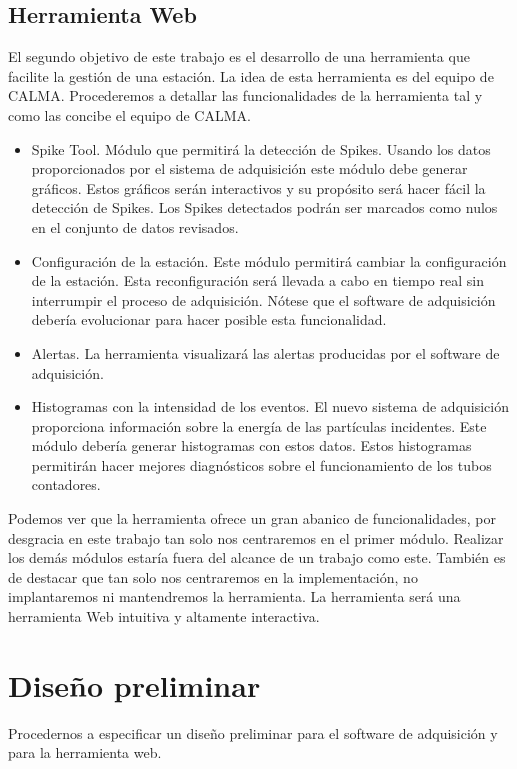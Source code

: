 	\subsection{Herramienta Web}
		El segundo objetivo de este trabajo es el desarrollo de una herramienta que facilite la gestión de una estación. La idea de esta
		herramienta es del equipo de CALMA. Procederemos a detallar las funcionalidades de la herramienta tal y como las concibe el equipo de
		CALMA.
		\begin{itemize}
	         	\item	Spike Tool. Módulo que permitirá la detección de Spikes. Usando los datos proporcionados por el sistema de
			  	adquisición este módulo debe generar gráficos. Estos gráficos serán interactivos y su propósito será hacer fácil la
				detección de Spikes. Los Spikes detectados podrán ser marcados como nulos en el conjunto de datos revisados. 
			\item 	Configuración de la estación. Este módulo permitirá cambiar la configuración de la estación. Esta reconfiguración será
				llevada a cabo en tiempo real sin interrumpir el proceso de adquisición. Nótese que el software de adquisición debería
				evolucionar para hacer posible esta funcionalidad.
			\item	Alertas. La herramienta visualizará las alertas producidas por el software de adquisición.
			\item 	Histogramas con la intensidad de los eventos. El nuevo sistema de adquisición proporciona información sobre la energía
				de las partículas incidentes. Este módulo debería generar histogramas con estos datos. Estos histogramas permitirán
				hacer mejores diagnósticos sobre el funcionamiento de los tubos contadores. 
		\end{itemize}
		Podemos ver que la herramienta ofrece un gran abanico de funcionalidades, por desgracia en este trabajo tan solo nos centraremos en el
		primer módulo. Realizar los demás módulos estaría fuera del alcance de un trabajo como este. También es de destacar que tan solo nos
		centraremos en la implementación, no implantaremos ni mantendremos la herramienta. La herramienta será una herramienta Web intuitiva y
		altamente interactiva. 

\section{Diseño preliminar}
	Procedernos a especificar un diseño preliminar para el software de adquisición y para la herramienta web.

